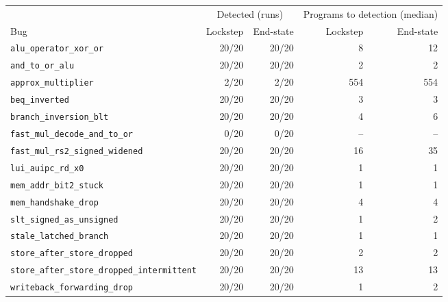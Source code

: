 \begin{tabular}{@{}l r r r r@{}}\toprule
& \multicolumn{2}{c}{Detected (runs)} & \multicolumn{2}{c}{Programs to detection (median)}\\\cmidrule(lr){2-3}\cmidrule(l){4-5}
Bug & Lockstep & End-state & Lockstep & End-state\\\midrule
\texttt{alu\_operator\_xor\_or} & 20/20 & 20/20 & 8 & 12\\
\texttt{and\_to\_or\_alu} & 20/20 & 20/20 & 2 & 2\\
\texttt{approx\_multiplier} & 2/20 & 2/20 & 554 & 554\\
\texttt{beq\_inverted} & 20/20 & 20/20 & 3 & 3\\
\texttt{branch\_inversion\_blt} & 20/20 & 20/20 & 4 & 6\\
\texttt{fast\_mul\_decode\_and\_to\_or} & 0/20 & 0/20 & -- & --\\
\texttt{fast\_mul\_rs2\_signed\_widened} & 20/20 & 20/20 & 16 & 35\\
\texttt{lui\_auipc\_rd\_x0} & 20/20 & 20/20 & 1 & 1\\
\texttt{mem\_addr\_bit2\_stuck} & 20/20 & 20/20 & 1 & 1\\
\texttt{mem\_handshake\_drop} & 20/20 & 20/20 & 4 & 4\\
\texttt{slt\_signed\_as\_unsigned} & 20/20 & 20/20 & 1 & 2\\
\texttt{stale\_latched\_branch} & 20/20 & 20/20 & 1 & 1\\
\texttt{store\_after\_store\_dropped} & 20/20 & 20/20 & 2 & 2\\
\texttt{store\_after\_store\_dropped\_intermittent} & 20/20 & 20/20 & 13 & 13\\
\texttt{writeback\_forwarding\_drop} & 20/20 & 20/20 & 1 & 2\\
\bottomrule\end{tabular}